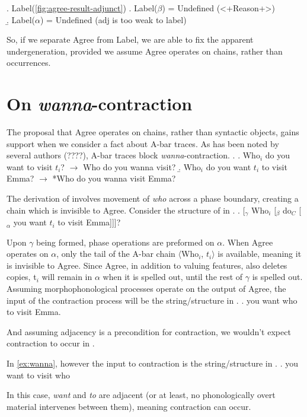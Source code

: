 \documentclass[MilwayThesis]{subfiles}
\begin{document}
\ex. Label(\ref{fig:agree-result-adjunct})
\a. Label($\beta$) = Undefined \hfill (<+Reason+>)\\
\b. Label($\alpha$) = Undefined \hfill(adj is too weak to label)

So, if we separate Agree from Label, we are able to fix the apparent undergeneration, provided we assume Agree operates on chains, rather than occurrences.
\section{On \textit{wanna}-contraction}\label{sec:wanna}
The proposal that Agree operates on chains, rather than syntactic objects, gains support when we consider a fact about A-bar traces.
As has been noted by several authors (????), A-bar traces block \textit{wanna}-contraction.
\ex.\label{ex:wanna-contraction}
\a.\label{ex:wanna} Who$_i$ do you want to visit $t_i$? $\rightarrow$ Who do you wanna visit?
\b.\label{exwant-to} Who$_i$ do you want $t_i$ to visit Emma? $\rightarrow$ *Who do you wanna visit Emma?

The derivation of \Last[b] involves movement of \textit{who} across a phase boundary, creating a chain which is invisible to Agree.
Consider the structure of \Last[b] in \Next.
\ex. \label{fig:star-wanna-tree}
[$_\gamma$ Who$_i$ [$_\beta$ do$_C$ [$_\alpha$ you want $t_i$ to visit Emma]]]?

Upon $\gamma$ being formed, phase operations are preformed on $\alpha$.
When Agree operates on $\alpha$, only the tail of the A-bar chain $\langle$Who$_i$, $t_i\rangle$ is available, meaning it is invisible to Agree.
Since Agree, in addition to valuing features, also deletes copies, t$_i$ will remain in $\alpha$ when it is spelled out, until the rest of $\gamma$ is spelled out.
Assuming morphophonological processes operate on the output of Agree, the input of the contraction process will be the string/structure in \Next.
\ex. you want who to visit Emma.

And assuming adjacency is a precondition for contraction, we wouldn't expect contraction to occur in \Last.

In \ref{ex:wanna}, however the input to contraction is the string/structure in \Next.
\ex. you want to visit who

In this case, \textit{want} and \textit{to} are adjacent (or at least, no phonologically overt material intervenes between them), meaning contraction can occur.
\end{document}
